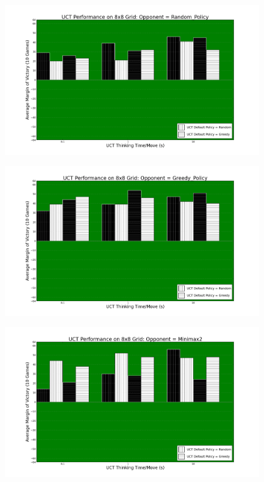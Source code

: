 \documentclass[12pt,letterpaper]{article}
\begin{document}
\pagebreak

\begin{figure}[!hp]
\begin{center}
\includegraphics[scale=.4]{88_Random_Policy}
\end{center}
\end{figure}

\begin{figure}[!hp]
\begin{center}
\includegraphics[scale=.4]{88_Greedy_Policy}
\end{center}
\end{figure}

\begin{figure}[!hp]
\begin{center}
\includegraphics[scale=.4]{88_Minimax2}
\end{center}
\end{figure}
\end{document}
